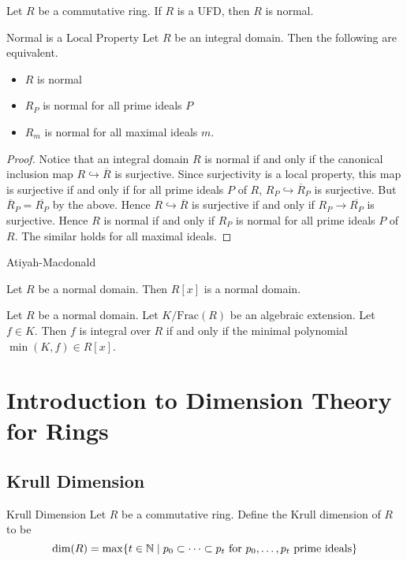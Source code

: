 \documentclass[a4paper]{article}
\begin{document}
\begin{prp}{}{} Let $R$ be a commutative ring. If $R$ is a UFD, then $R$ is normal. 
\end{prp}

\begin{prp}{Normal is a Local Property}{} Let $R$ be an integral domain. Then the following are equivalent. 
\begin{itemize}
\item $R$ is normal
\item $R_P$ is normal for all prime ideals $P$
\item $R_m$ is normal for all maximal ideals $m$. 
\end{itemize} \tcbline
\begin{proof}
Notice that an integral domain $R$ is normal if and only if the canonical inclusion map $R\hookrightarrow\overline{R}$ is surjective. Since surjectivity is a local property, this map is surjective if and only if for all prime ideals $P$ of $R$, $R_P\hookrightarrow\overline{R}_P$ is surjective. But $\overline{R}_P=\overline{R_P}$ by the above. Hence $R\hookrightarrow\overline{R}$ is surjective if and only if $R_P\to\overline{R_P}$ is surjective. Hence $R$ is normal if and only if $R_P$ is normal for all prime ideals $P$ of $R$. The similar holds for all maximal ideals. 
\end{proof}
\end{prp}

Atiyah-Macdonald

\begin{prp}{}{} Let $R$ be a normal domain. Then $R[x]$ is a normal domain. 
\end{prp}

\begin{prp}{}{} Let $R$ be a normal domain. Let $K/\text{Frac}(R)$ be an algebraic extension. Let $f\in K$. Then $f$ is integral over $R$ if and only if the minimal polynomial $\min(K,f)\in R[x]$. 
\end{prp}

\pagebreak
\section{Introduction to Dimension Theory for Rings}
\subsection{Krull Dimension}
\begin{defn}{Krull Dimension}{} Let $R$ be a commutative ring. Define the Krull dimension of $R$ to be $$\dim(R)=\max\{t\in\mathbb{N}\;|\;p_0\subset\dots\subset p_t\text{ for }p_0,\dots,p_t\text{ prime ideals}\}$$
\end{defn}
\end{document}
